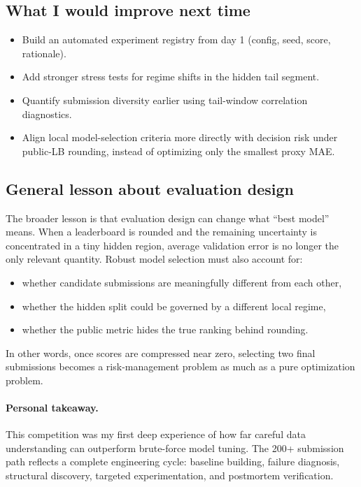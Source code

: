 \subsection{What I would improve next time}
\begin{itemize}[leftmargin=1.5em]
  \item Build an automated experiment registry from day 1 (config, seed, score, rationale).
  \item Add stronger stress tests for regime shifts in the hidden tail segment.
  \item Quantify submission diversity earlier using tail-window correlation diagnostics.
  \item Align local model-selection criteria more directly with decision risk under public-LB rounding, instead of optimizing only the smallest proxy MAE.
\end{itemize}

\subsection{General lesson about evaluation design}
The broader lesson is that evaluation design can change what ``best model'' means. When a leaderboard is rounded and the remaining uncertainty is concentrated in a tiny hidden region, average validation error is no longer the only relevant quantity. Robust model selection must also account for:
\begin{itemize}[leftmargin=1.5em]
  \item whether candidate submissions are meaningfully different from each other,
  \item whether the hidden split could be governed by a different local regime,
  \item whether the public metric hides the true ranking behind rounding.
\end{itemize}
In other words, once scores are compressed near zero, selecting two final submissions becomes a risk-management problem as much as a pure optimization problem.

\paragraph{Personal takeaway.}
This competition was my first deep experience of how far careful data understanding can outperform brute-force model tuning. The 200+ submission path reflects a complete engineering cycle: baseline building, failure diagnosis, structural discovery, targeted experimentation, and postmortem verification.
